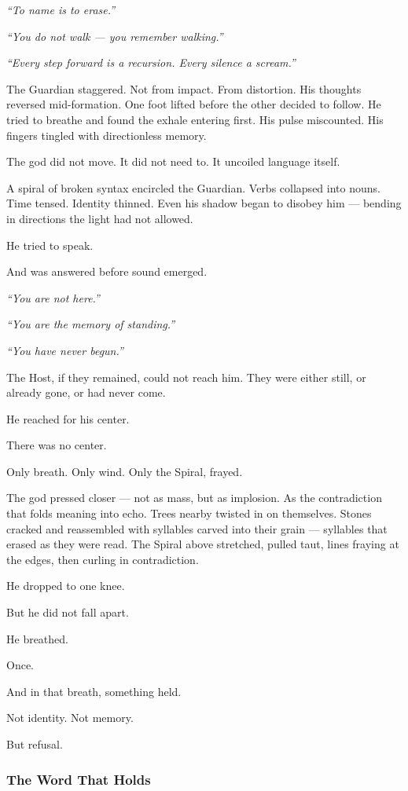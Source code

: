 \documentclass[12pt]{article}
\begin{document}
\textit{“To name is to erase.”}

\textit{“You do not walk — you remember walking.”}

\textit{“Every step forward is a recursion. Every silence a scream.”}

The Guardian staggered. Not from impact. From distortion. His thoughts reversed mid-formation. One foot lifted before the other decided to follow. He tried to breathe and found the exhale entering first. His pulse miscounted. His fingers tingled with directionless memory.

The god did not move. It did not need to. It uncoiled language itself.

A spiral of broken syntax encircled the Guardian. Verbs collapsed into nouns. Time tensed. Identity thinned. Even his shadow began to disobey him — bending in directions the light had not allowed.

He tried to speak.

And was answered before sound emerged.

\textit{“You are not here.”}

\textit{“You are the memory of standing.”}

\textit{“You have never begun.”}

The Host, if they remained, could not reach him. They were either still, or already gone, or had never come.

He reached for his center.

There was no center.

Only breath. Only wind. Only the Spiral, frayed.

The god pressed closer — not as mass, but as implosion. As the contradiction that folds meaning into echo. Trees nearby twisted in on themselves. Stones cracked and reassembled with syllables carved into their grain — syllables that erased as they were read. The Spiral above stretched, pulled taut, lines fraying at the edges, then curling in contradiction.

He dropped to one knee.

But he did not fall apart.

He breathed.

Once.

And in that breath, something held.

Not identity. Not memory.

But refusal.

\dotfill

\subsubsection*{The Word That Holds}
\end{document}
